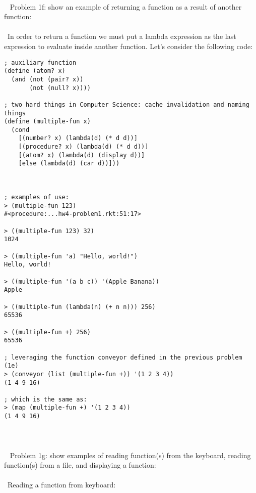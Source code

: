 \documentclass{article}
\begin{document}
\paragraph{}\
\rmfamily
Problem 1f: show an example of returning a function as a result of another function:
\paragraph{}\
In order to return a function we must put a lambda expression as the last expression to evaluate inside another function. Let's consider the following code:
\begin{verbatim}
; auxiliary function
(define (atom? x)
  (and (not (pair? x))
       (not (null? x))))   
 
; two hard things in Computer Science: cache invalidation and naming things
(define (multiple-fun x)
  (cond
    [(number? x) (lambda(d) (* d d))]
    [(procedure? x) (lambda(d) (* d d))]
    [(atom? x) (lambda(d) (display d))]
    [else (lambda(d) (car d))]))
    
    
    
; examples of use:
> (multiple-fun 123)
#<procedure:...hw4-problem1.rkt:51:17>

> ((multiple-fun 123) 32)
1024

> ((multiple-fun 'a) "Hello, world!")
Hello, world!

> ((multiple-fun '(a b c)) '(Apple Banana))
Apple

> ((multiple-fun (lambda(n) (+ n n))) 256)
65536

> ((multiple-fun +) 256)
65536

; leveraging the function conveyor defined in the previous problem (1e)
> (conveyor (list (multiple-fun +)) '(1 2 3 4))
(1 4 9 16) 

; which is the same as:
> (map (multiple-fun +) '(1 2 3 4))
(1 4 9 16)
\end{verbatim}

\paragraph{}\
\paragraph{}\
\rmfamily
Problem 1g: show examples of reading function(s) from the keyboard, reading function(s) from a file, and displaying a function:
\paragraph{}\
Reading a function from keyboard:
\end{document}
